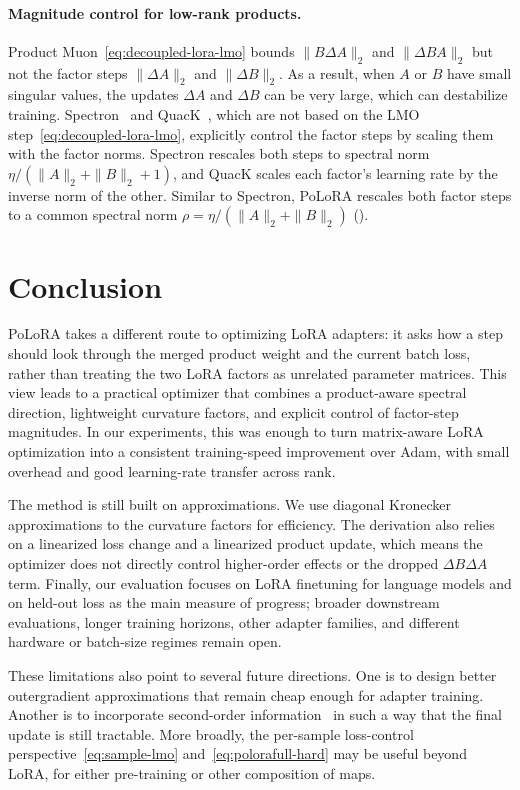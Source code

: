 \documentclass[11pt]{article}
\newcommand{\norm}[1]{\| #1\|}
\newcommand{\methodname}{PoLoRA\xspace}
\theoremstyle{plain}
\theoremstyle{definition}
\theoremstyle{remark}
\theoremstyle{definition}
\begin{document}
\paragraph{Magnitude control for low-rank products.}
Product Muon~\eqref{eq:decoupled-lora-lmo} bounds $\norm{B\Delta A}_2$ and $\norm{\Delta B A}_2$ but not the factor steps $\norm{\Delta A}_2$ and $\norm{\Delta B}_2$. As a result, when $A$ or $B$ have small singular values, the updates $\Delta A$ and $\Delta B$ can be very large, which can destabilize training. Spectron~\cite{spectron} and QuacK~\cite{quack}, which are not based on the LMO step~\eqref{eq:decoupled-lora-lmo},
explicitly control the factor steps by scaling them with the factor norms. Spectron rescales both steps to spectral norm $\eta/(\norm{A}_2+\norm{B}_2+1)$, and QuacK scales each factor's learning rate by the inverse norm of the other. Similar to Spectron, \methodname{} rescales both factor steps to a common spectral norm $\rho=\eta/(\norm{A}_2+\norm{B}_2)$ ().


\section{Conclusion}
\label{sec:conclusion}

\methodname{} takes a different route to optimizing LoRA adapters: it asks how a step should look through the merged product weight and the current batch loss, rather than treating the two LoRA factors as unrelated parameter matrices. This view leads to a practical optimizer that combines a product-aware spectral direction, lightweight curvature factors, and explicit control of factor-step magnitudes. In our experiments, this was enough to turn matrix-aware LoRA optimization into a consistent training-speed improvement over Adam, with small overhead and good learning-rate transfer across rank.

The method is still built on approximations. We use diagonal Kronecker approximations to the curvature factors for efficiency. The derivation also relies on a linearized loss change and a linearized product update, which means the optimizer does not directly control higher-order effects or the dropped $\Delta B\Delta A$ term. Finally, our evaluation focuses on LoRA finetuning for language models and on held-out loss as the main measure of progress; broader downstream evaluations, longer training horizons, other adapter families, and different hardware or batch-size regimes remain open.


These limitations also point to several future directions. One is to design better outergradient approximations that remain cheap enough for adapter training. Another is to incorporate second-order information~\cite{du2026newtonmuonoptimizer} in such a way that the final update is still tractable.  More broadly, the per-sample loss-control perspective~\eqref{eq:sample-lmo} and~\eqref{eq:polorafull-hard}  may be useful beyond LoRA, for either pre-training or other composition of maps.
\end{document}
